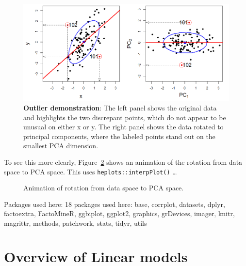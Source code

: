 \documentclass[
  letterpaper,
  10pt,
  krantz2]{krantz}
\begin{document}
\begin{figure}

{\centering \includegraphics[width=1\textwidth,height=\textheight]{images/outlier-demo.png}

}

\caption{\label{fig-outlier-demo}\textbf{Outlier demonstration}: The
left panel shows the original data and highlights the two discrepant
points, which do not appear to be unusual on either x or y. The right
panel shows the data rotated to principal components, where the labeled
points stand out on the smallest PCA dimension.}

\end{figure}

To see this more clearly, Figure~\ref{fig-outlier-animation} shows an
animation of the rotation from data space to PCA space. This uses
\texttt{heplots::interpPlot()} \ldots{}

\begin{figure}

{\centering 

}

\caption{\label{fig-outlier-animation}Animation of rotation from data
space to PCA space.}

\end{figure}

Packages used here: 18 packages used here: base, corrplot, datasets,
dplyr, factoextra, FactoMineR, ggbiplot, ggplot2, graphics, grDevices,
imager, knitr, magrittr, methods, patchwork, stats, tidyr, utils


\hypertarget{sec-linear-models}{%
\chapter{Overview of Linear models}\label{sec-linear-models}}
\end{document}
